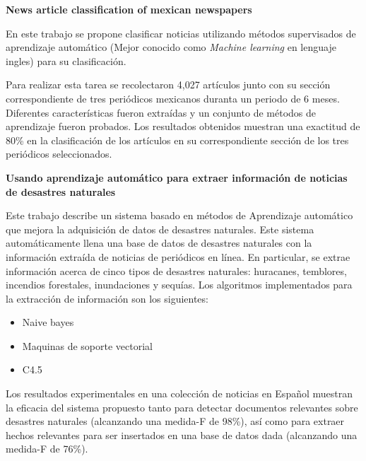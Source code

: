 
\begin{large}
	 \textbf{News article classification of mexican newspapers}\\
\end{large}

En este trabajo se propone clasificar noticias utilizando métodos supervisados de aprendizaje automático (Mejor conocido como \textit{Machine learning} en lenguaje ingles) para su clasificación\citep{CD10}.

Para realizar esta tarea se recolectaron 4,027 artículos junto con su sección correspondiente de tres periódicos mexicanos duranta un periodo de 6 meses. Diferentes características fueron extraídas y un conjunto de métodos de aprendizaje fueron probados. Los resultados obtenidos muestran una exactitud de 80\% en la clasificación de los artículos en su correspondiente sección de los tres periódicos seleccionados.\\


\begin{large}
	 \textbf{Usando aprendizaje automático para extraer información de noticias de desastres naturales}\\
\end{large}


Este trabajo describe un sistema basado en métodos de Aprendizaje automático que mejora la adquisición de datos de desastres naturales\citep{CD11}. Este sistema automáticamente llena una base de datos de desastres naturales con la información extraída de noticias de periódicos en línea. En particular, se extrae información acerca de cinco tipos de desastres naturales: huracanes, temblores, incendios forestales, inundaciones y sequías. Los algoritmos implementados para la extracción de información son los siguientes: 

\begin{itemize}
	\item Naive bayes
	\item Maquinas de soporte vectorial
	\item C4.5
\end{itemize} 

Los resultados experimentales en una colección de noticias en Español muestran la eficacia del sistema propuesto tanto para detectar documentos relevantes sobre desastres naturales (alcanzando una medida-F de 98\%), así como para extraer hechos relevantes para ser insertados en una base de datos dada (alcanzando una medida-F de 76\%).

